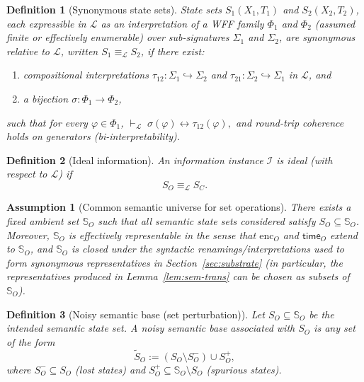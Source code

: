 \documentclass[journal]{IEEEtran}
\newcommand{\enc}{\text{enc}}
\newcommand{\timeindex}{\mathsf{time}}
\newtheorem{assumption}{Assumption}[section]
\newtheorem{definition}{Definition}[section]
\numberwithin{equation}{section}
\begin{document}
\begin{definition}[Synonymous state sets]
\label{def:synonymous-states}
State sets \(S_1(X_1,T_1)\) and \(S_2(X_2,T_2)\), each expressible in \(\mathcal L\) as an interpretation of a
WFF family \(\Phi_1\) and \(\Phi_2\) (assumed finite or effectively enumerable) over sub-signatures
\(\Sigma_1\) and \(\Sigma_2\), are \emph{synonymous relative to \(\mathcal{L}\)}, written
\(S_1\equiv_\mathcal{L}S_2\), if there exist:
\begin{enumerate}[label=\textup{(\roman*)}]
  \item compositional interpretations \(\tau_{12}:\Sigma_1\hookrightarrow\Sigma_2\) and
  \(\tau_{21}:\Sigma_2\hookrightarrow\Sigma_1\) in \(\mathcal{L}\), and
  \item a bijection \(\sigma:\Phi_1\to\Phi_2\),
\end{enumerate}
such that for every \(\varphi\in\Phi_1\),
\(
  \vdash_{\mathcal{L}}\;\sigma(\varphi)\leftrightarrow\tau_{12}(\varphi),
\)
and round-trip coherence holds on generators (bi-interpretability).
\end{definition}

\begin{definition}[Ideal information]
\label{def:ideal-info}
An information instance \(\mathcal I\) is \emph{ideal} (with respect to \(\mathcal L\)) if
\[
  S_O \equiv_{\mathcal L} S_C.
\]
\end{definition}

\begin{assumption}[Common semantic universe for set operations]
\label{assump:semantic-universe}
There exists a fixed ambient set \(\mathbb{S}_O\) such that all semantic state sets considered satisfy
\(S_O\subseteq \mathbb{S}_O\).
Moreover, \(\mathbb{S}_O\) is effectively representable in the sense that \(\enc_O\) and \(\timeindex_O\) extend to
\(\mathbb S_O\), and \(\mathbb S_O\) is closed under the syntactic renamings/interpretations used to form synonymous
representatives in Section~\ref{sec:substrate} (in particular, the representatives produced in
Lemma~\ref{lem:sem-trans} can be chosen as subsets of \(\mathbb S_O\)).
\end{assumption}

\begin{definition}[Noisy semantic base (set perturbation)]
\label{def:noisy}
Let \(S_O\subseteq \mathbb S_O\) be the intended semantic state set.
A \emph{noisy semantic base} associated with \(S_O\) is any set of the form
\[
  \tilde S_O := (S_O \setminus S_O^-) \cup S_O^+,
\]
where \(S_O^- \subseteq S_O\) (lost states) and \(S_O^+ \subseteq \mathbb S_O\setminus S_O\) (spurious states).
\end{definition}
\end{document}
